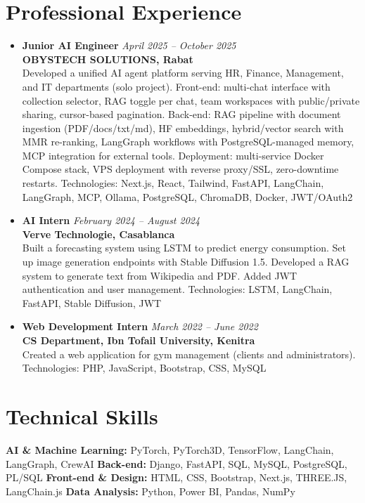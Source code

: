 \documentclass[10pt,a4paper]{article}
\newcommand{\cvitem}[2]{\textbf{#1} \hfill \textit{#2}}
\begin{document}
\section*{Professional Experience}
\begin{itemize}
    \item \cvitem{Junior AI Engineer}{April 2025 -- October 2025}\\
    \textbf{OBYSTECH SOLUTIONS, Rabat}\\
    Developed a unified AI agent platform serving HR, Finance, Management, and IT departments (solo project). Front-end: multi-chat interface with collection selector, RAG toggle per chat, team workspaces with public/private sharing, cursor-based pagination. Back-end: RAG pipeline with document ingestion (PDF/docs/txt/md), HF embeddings, hybrid/vector search with MMR re-ranking, LangGraph workflows with PostgreSQL-managed memory, MCP integration for external tools. Deployment: multi-service Docker Compose stack, VPS deployment with reverse proxy/SSL, zero-downtime restarts. Technologies: Next.js, React, Tailwind, FastAPI, LangChain, LangGraph, MCP, Ollama, PostgreSQL, ChromaDB, Docker, JWT/OAuth2
    \item \cvitem{AI Intern}{February 2024 -- August 2024}\\
    \textbf{Verve Technologie, Casablanca}\\
    Built a forecasting system using LSTM to predict energy consumption. Set up image generation endpoints with Stable Diffusion 1.5. Developed a RAG system to generate text from Wikipedia and PDF. Added JWT authentication and user management. Technologies: LSTM, LangChain, FastAPI, Stable Diffusion, JWT
    \item \cvitem{Web Development Intern}{March 2022 -- June 2022}\\
    \textbf{CS Department, Ibn Tofail University, Kenitra}\\
    Created a web application for gym management (clients and administrators). Technologies: PHP, JavaScript, Bootstrap, CSS, MySQL
\end{itemize}

\section*{Technical Skills}
\textbf{AI \& Machine Learning:} PyTorch, PyTorch3D, TensorFlow, LangChain, LangGraph, CrewAI \quad
\textbf{Back-end:} Django, FastAPI, SQL, MySQL, PostgreSQL, PL/SQL \quad
\textbf{Front-end \& Design:} HTML, CSS, Bootstrap, Next.js, THREE.JS, LangChain.js \quad
\textbf{Data Analysis:} Python, Power BI, Pandas, NumPy
\end{document}
